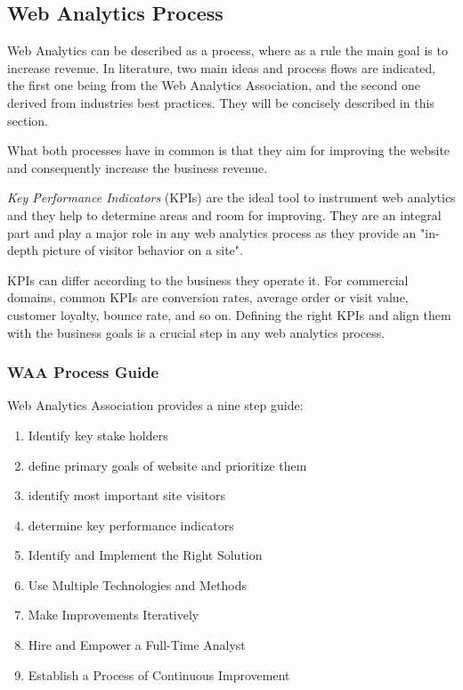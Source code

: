 




\subsection{Web Analytics Process}


Web Analytics can be described as a process, where as a rule the main goal is to increase revenue.
In literature, two main ideas and process flows are indicated, the first one being from the Web Analytics Association, and the second one derived from industries best practices.
They will be concisely described in this section.

What both processes have in common is that they aim for improving the website and consequently increase the business revenue.

\textit{Key Performance Indicators} (KPIs) are the ideal tool to instrument web analytics and they help to determine areas and room for improving.
They are an integral part and play a major role in any web analytics process as they provide an "in-depth picture of visitor behavior on a site". %

KPIs can differ according to the business they operate it.
For commercial domains, common KPIs are conversion rates, average order or visit value, customer loyalty, bounce rate, and so on.%
Defining the right KPIs and align them with the business goals is a crucial step in any web analytics process.




\subsubsection{WAA Process Guide}

Web Analytics Association provides a nine step guide:%
\begin{enumerate}
\item Identify key stake holders
\item define primary goals of website and prioritize them
\item identify most important site visitors
\item determine key performance indicators
\item Identify and Implement the Right Solution
\item Use Multiple Technologies and Methods
\item Make Improvements Iteratively
\item Hire and Empower a Full-Time Analyst
\item Establish a Process of Continuous Improvement
\end{enumerate}



